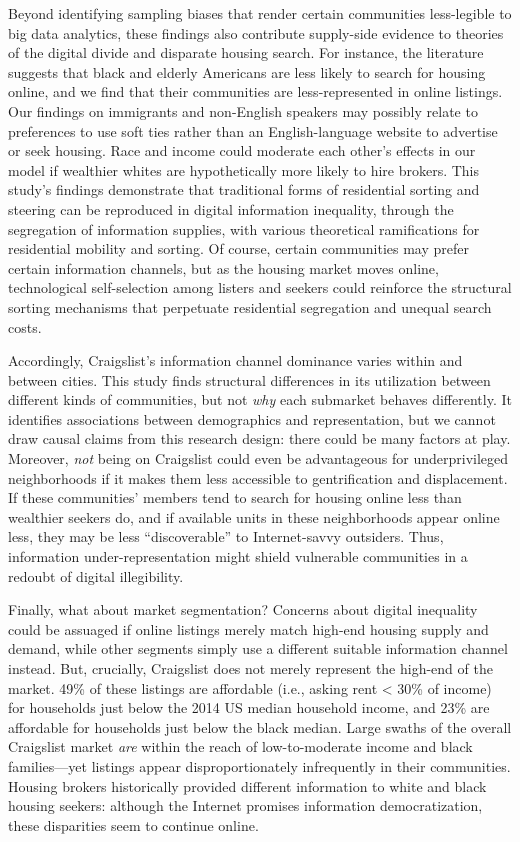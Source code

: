 \documentclass[11pt,letterpaper]{article}
\begin{document}
Beyond identifying sampling biases that render certain communities less-legible to big data analytics, these findings also contribute supply-side evidence to theories of the digital divide and disparate housing search. For instance, the literature suggests that black and elderly Americans are less likely to search for housing online, and we find that their communities are less-represented in online listings. Our findings on immigrants and non-English speakers may possibly relate to preferences to use soft ties rather than an English-language website to advertise or seek housing. Race and income could moderate each other's effects in our model if wealthier whites are hypothetically more likely to hire brokers. This study's findings demonstrate that traditional forms of residential sorting and steering can be reproduced in digital information inequality, through the segregation of information supplies, with various theoretical ramifications for residential mobility and sorting. Of course, certain communities may prefer certain information channels, but as the housing market moves online, technological self-selection among listers and seekers could reinforce the structural sorting mechanisms that perpetuate residential segregation and unequal search costs.

Accordingly, Craigslist's information channel dominance varies within and between cities. This study finds structural differences in its utilization between different kinds of communities, but not \emph{why} each submarket behaves differently. It identifies associations between demographics and representation, but we cannot draw causal claims from this research design: there could be many factors at play. Moreover, \emph{not} being on Craigslist could even be advantageous for underprivileged neighborhoods if it makes them less accessible to gentrification and displacement. If these communities' members tend to search for housing online less than wealthier seekers do, and if available units in these neighborhoods appear online less, they may be less \enquote{discoverable} to Internet-savvy outsiders. Thus, information under-representation might shield vulnerable communities in a redoubt of digital illegibility.

Finally, what about market segmentation? Concerns about digital inequality could be assuaged if online listings merely match high-end housing supply and demand, while other segments simply use a different suitable information channel instead. But, crucially, Craigslist does not merely represent the high-end of the market. 49\% of these listings are affordable (i.e., asking rent < 30\% of income) for households just below the 2014 US median household income, and 23\% are affordable for households just below the black median. Large swaths of the overall Craigslist market \emph{are} within the reach of low-to-moderate income and black families---yet listings appear disproportionately infrequently in their communities. Housing brokers historically provided different information to white and black housing seekers: although the Internet promises information democratization, these disparities seem to continue online.
\end{document}
